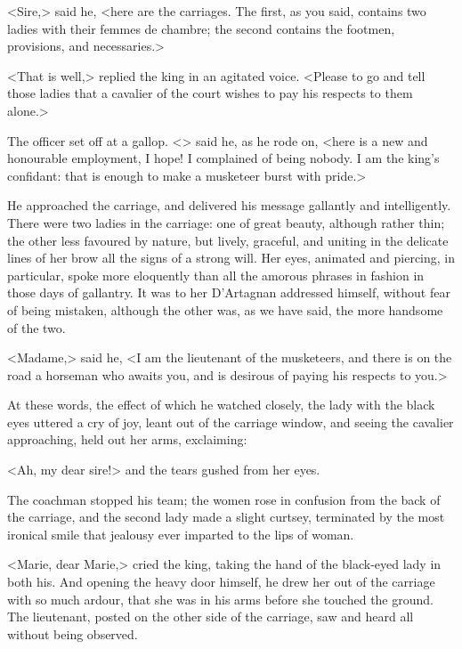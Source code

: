<Sire,> said he, <here are the carriages. The first, as you said, contains two ladies with their femmes de chambre; the second contains the footmen, provisions, and necessaries.>

<That is well,> replied the king in an agitated voice. <Please to go and tell those ladies that a cavalier of the court wishes to pay his respects to them alone.>

The officer set off at a gallop. <> said he, as he rode on, <here is a new and honourable employment, I hope! I complained of being nobody. I am the king's confidant: that is enough to make a musketeer burst with pride.>

He approached the carriage, and delivered his message gallantly and intelligently. There were two ladies in the carriage: one of great beauty, although rather thin; the other less favoured by nature, but lively, graceful, and uniting in the delicate lines of her brow all the signs of a strong will. Her eyes, animated and piercing, in particular, spoke more eloquently than all the amorous phrases in fashion in those days of gallantry. It was to her D'Artagnan addressed himself, without fear of being mistaken, although the other was, as we have said, the more handsome of the two.

<Madame,> said he, <I am the lieutenant of the musketeers, and there is on the road a horseman who awaits you, and is desirous of paying his respects to you.>

At these words, the effect of which he watched closely, the lady with the black eyes uttered a cry of joy, leant out of the carriage window, and seeing the cavalier approaching, held out her arms, exclaiming:

<Ah, my dear sire!> and the tears gushed from her eyes.

The coachman stopped his team; the women rose in confusion from the back of the carriage, and the second lady made a slight curtsey, terminated by the most ironical smile that jealousy ever imparted to the lips of woman.

<Marie, dear Marie,> cried the king, taking the hand of the black-eyed lady in both his. And opening the heavy door himself, he drew her out of the carriage with so much ardour, that she was in his arms before she touched the ground. The lieutenant, posted on the other side of the carriage, saw and heard all without being observed.

